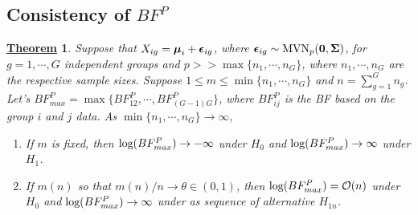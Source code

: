 \documentclass[12pt]{article}
\newtheorem{Th}{\underline{\bf Theorem}}
\def\bzero{{\mathbf 0}}
\def\log{\hbox{log}}
\def\MVN{\hbox{MVN}}
\def\log{\hbox{log}}
\def\bzero{{\mathbf 0}}
\newcommand{\uepsilon}          {\mbox{\boldmath$\epsilon$}}
\newcommand{\umu}               {\mbox{\boldmath$\mu$}}
\newcommand{\uSigma}            {\mbox{\boldmath$\Sigma$}}
\begin{document}
\subsection{Consistency of $BF^{P}$}
\begin{Th}
Suppose that $X_{ig} = \umu_i + \uepsilon_{ig}$, where $\uepsilon_{ig} \sim \MVN_{p}(\bzero, \uSigma)$, for $g = 1, \cdots, G$ independent groups and $p >> \max\{n_1, \cdots, n_{G}\}$, where $n_1, \cdots, n_{G}$ are the respective sample sizes. Suppose $1 \leq m  \leq \min\{n_1, \cdots, n_{G}\}$ and $n = \sum^{G}_{g=1}n_g$. Let's $BF^{P}_{max} = \max\{BF^{P}_{12}, \cdots, BF^{P}_{(G-1)G}\}$, where $BF^{P}_{ij}$ is the BF based on the group $i$ and $j$ data. As $\min\{n_1, \cdots, n_{G}\} \rightarrow \infty$,
\begin{enumerate}
    \item If $m$ is fixed, then $\log(BF^{P}_{max}) \rightarrow -\infty$ under $H_0$ and $\log(BF^{P}_{max}) \rightarrow \infty$ under $H_1$.
    \item If $m(n)$ so that $m(n)/n \rightarrow \theta \in (0, 1)$, then $\log(BF^{P}_{max}) = \mathcal{O}(n)$ under $H_0$ and $\log(BF^{P}_{max}) \rightarrow \infty$ under as sequence of alternative $H_{1n}$.
\end{enumerate}
\end{Th}
\end{document}
